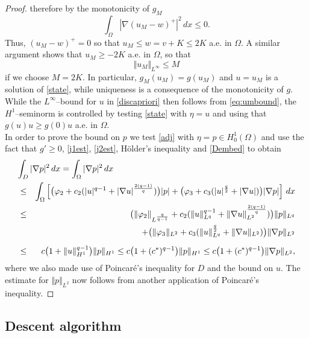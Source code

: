 \documentclass[a4paper,10pt]{article}
\newcommand{\dx}{\,dx}
\theoremstyle{plain}
\theoremstyle{plain}
\numberwithin{equation}{section}
\begin{document}
\begin{proof}
therefore by the monotonicity of $g_M$
\begin{displaymath}
    \int_\Omega | \nabla(u_M-w)^+ |^2 \dx \leq 0.
\end{displaymath}
Thus, $(u_M - w)^+=0$ so that $u_M \leq w =v+K \leq 2K$ a.e. in $\Omega$. A similar argument
shows that $u_M \geq -2K$ a.e. in $\Omega$, so that 
\begin{equation} \label{eq:umbound}
\Vert  u_M \Vert_{L^\infty}  \leq M
\end{equation}
if we choose $M=2K$. In particular, $g_M(u_M)=g(u_M)$ and $u=u_M$ is a solution of
\eqref{state}, while uniqueness is a consequence of the monotonicity of $g$. While the $L^\infty$--bound for $u$ in \eqref{discapriori} then follows from \eqref{eq:umbound}, the $H^1$--seminorm is controlled
by testing \eqref{state} with $\eta=u$ and using that $g(u)u
\geq g(0)u$ a.e. in $\Omega$. \\
In order to prove the bound on $p$ we test \eqref{adj} with $\eta=p \in H^1_0(\Omega)$ and use 
the fact that $g' \geq 0$, \eqref{j1est}, \eqref{j2est},
H\"older's inequality and  {\eqref{Dembed}} to obtain
\begin{eqnarray*}
\lefteqn{  \int_D | \nabla p |^2  \dx = 
\int_{\Omega} | \nabla p |^2  \dx    } \\
 & \leq & \int_{\Omega} \left[ \bigl( \varphi_2 + c_2( | u |^{q-1} + | \nabla u |^{\frac{2(q-1)}{q}} ) \bigr) | p | + \bigl( \varphi_3 + c_3( | u|^{\frac{q}{2}} + | \nabla u | ) \bigr)  | \nabla p | 
 \right] \dx \\
& \leq & \bigl( \Vert \varphi_2 \Vert_{L^{\frac{q}{q-1}}} + c_2(\Vert u \Vert_{L^q}^{q-1} + \Vert \nabla u \Vert_{L^2}^{\frac{2(q-1)}{q}} ) \bigr)  \Vert p \Vert_{L^q}   \\
& & + \bigl( \Vert \varphi_3 \Vert_{L^2} + c_3( \Vert u \Vert_{L^q}^{\frac{q}{2}} + \Vert \nabla u \Vert_{L^2})  \bigr) \Vert  \nabla p \Vert_{L^2} \\[2mm]
& \leq & c \bigl( 1+ \Vert u \Vert_{H^1}^{q-1}  \bigr)   \Vert p \Vert_{H^1} \leq c \bigl( 1 + (c^*)^{q-1} \bigr) \Vert p \Vert_{H^1} \leq c \bigl( 1 + (c^*)^{q-1} \bigr) \Vert \nabla p \Vert_{L^2},
\end{eqnarray*}
{where we also made use of Poincar\'e's inequality for $D$ and the bound on $u$.} The estimate for 
$\Vert p \Vert_{L^2}$ now follows from another application  of Poincar\'e's inequality.
\end{proof}
\noindent

\subsection{Descent algorithm} 
\end{document}
